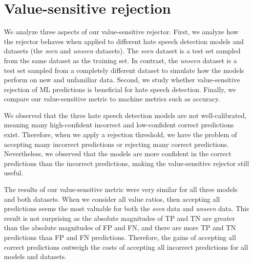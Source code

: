 \section{Value-sensitive rejection}
\label{sec:discussion-rejection}
We analyze three aspects of our value-sensitive rejector.
%
First, we analyze how the rejector behaves when applied to different hate speech detection models and datasets (the \emph{seen} and \emph{unseen} datasets).
%
The \emph{seen} dataset is a test set sampled from the same dataset as the training set.
%
In contrast, the \emph{unseen} dataset is a test set sampled from a completely different dataset to simulate how the models perform on new and unfamiliar data.
%
Second, we study whether value-sensitive rejection of ML predictions is beneficial for hate speech detection.
%
Finally, we compare our value-sensitive metric to machine metrics such as accuracy.
%

%
We observed that the three hate speech detection models are not well-calibrated, meaning many high-confident incorrect and low-confident correct predictions exist.
%
Therefore, when we apply a rejection threshold, we have the problem of accepting many incorrect predictions or rejecting many correct predictions.
%
Nevertheless, we observed that the models are more confident in the correct predictions than the incorrect predictions, making the value-sensitive rejector still useful.
%

%
The results of our value-sensitive metric were very similar for all three models and both datasets.
%
When we consider all value ratios, then accepting all predictions seems the most valuable for both the \emph{seen} data and \emph{unseen} data.
%
This result is not surprising as the absolute magnitudes of TP and TN are greater than the absolute magnitudes of FP and FN, and there are more TP and TN predictions than FP and FN predictions.
%
Therefore, the gains of accepting all correct predictions outweigh the costs of accepting all incorrect predictions for all models and datasets.
%

